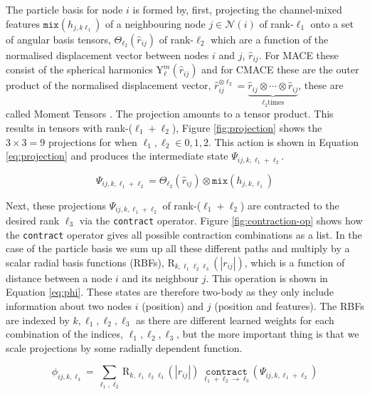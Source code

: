 The particle basis for node $i$ is formed by, first, projecting the channel-mixed features $\texttt{mix}(h_{j,k\ell_1})$ of a neighbouring node $j \in \mathcal N(i)$ of rank-$\ell_1$ onto a set of angular basis tensors, $\Theta_{\ell_2}(\hat r_{ij})$ of rank-$\ell_2$ which are a function of the normalised displacement vector between nodes $i$ and $j$, $\hat r_{ij}$. For MACE these consist of the spherical harmonics $\mathrm Y^m_\ell(\hat r_{ij})$ and for CMACE these are the outer product of the normalised displacement vector, $\hat r_{ij}^{\otimes \ell_2} = \underbrace{\hat r_{ij} \otimes \cdots \otimes \hat r_{ij}}_{\ell_2 \text{times}}$, these are called Moment Tensors \cite{shapeev2016moment}. The projection amounts to a tensor product. This results in tensors with rank-($\ell_1 + \ell_2$), Figure \ref{fig:projection} shows the  $3\times 3 = 9$ projections for when $\ell_1, \ell_2 \in {0,1,2}$. This action is shown in Equation \ref{eq:projection} and produces the intermediate state $\Psi_{ij,k,\ell_1+\ell_2}$.

\begin{equation} \label{eq:projection}
    \Psi_{ij,k,\ell_1+\ell_2} = \Theta_{\ell_2}(\hat r_{ij}) \otimes \texttt{mix}(h_{j,k,\ell_1})
\end{equation}

Next, these projections $\Psi_{ij,k,\ell_1+\ell_2}$ of rank-($\ell_1 + \ell_2$) are contracted to the desired rank $\ell_3$ via the \texttt{contract} operator. Figure \ref{fig:contraction-op} shows how the \texttt{contract} operator gives all possible contraction combinations as a list. In the case of the particle basis we sum up all these different paths and multiply by a scalar radial basis functions (RBFs), $\mathrm R_{k,\ell_1\ell_2\ell_3}(|r_{ij}|)$, which is a function of distance between a node $i$ and its neighbour $j$. This operation is shown in Equation \ref{eq:phi}. These states are therefore two-body as they only include information about two nodes $i$ (position) and $j$ (position and features). The RBFs are indexed by $k,\ell_1,\ell_2,\ell_3$ as there are different learned weights for each combination of the indices, $\ell_1,\ell_2,\ell_3$, but the more important thing is that we scale projections by some radially dependent function. 

\begin{equation} \label{eq:phi}
    \phi_{ij,k,\ell_3} = \sum_{\ell_1 ,\ell_2} \mathrm R_{k,\ell_1\ell_2\ell_3}(|r_{ij}|)\;\underset{\ell_1+\ell_2 \rightarrow \ell_3}{\texttt{contract}}(\Psi_{ij,k,\ell_1+\ell_2})
\end{equation}

